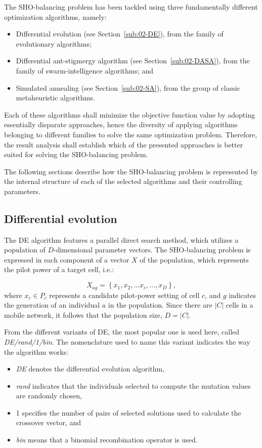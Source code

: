 The SHO-balancing problem has been tackled using three fundamentally
different optimization algorithms, namely:
\begin{itemize}
\item Differential evolution (see Section~\ref{sub:02-DE}), from the family
of evolutionary algorithms;
\item Differential ant-stigmergy algorithm (see Section~\ref{sub:02-DASA}),
from the family of swarm-intelligence algorithms; and
\item Simulated annealing (see Section~\ref{sub:02-SA}), from the group
of classic metaheuristic algorithms.
\end{itemize}
Each of these algorithms shall minimize the objective function value
by adopting essentially disparate approaches, hence the diversity
of applying algorithms belonging to different families to solve the
same optimization problem. Therefore, the result analysis shall establish
which of the presented approaches is better suited for solving the
SHO-balancing problem.

The following sections describe how the SHO-balancing problem is represented
by the internal structure of each of the selected algorithms and their
controlling parameters.


\subsection{Differential evolution}

The DE algorithm features a parallel direct search method, which utilizes
a population of $D$-dimensional parameter vectors. The SHO-balancing
problem is expressed in each component of a vector $X$ of the population,
which represents the pilot power of a target cell, i.e.:

\begin{equation}
X_{ag}=\left\{ x_{1},x_{2},\ldots x_{c},\ldots,x_{D}\right\} ,\label{eq:07-DE_mapping}
\end{equation}
where $x_{c}\in P_{c}$ represents a candidate pilot-power setting
of cell $c$, and $g$ indicates the generation of an individual $a$
in the population. Since there are $|C|$ cells in a mobile network,
it follows that the population size, $D=|C|$.

From the different variants of DE, the most popular one is used here,
called \emph{DE/rand/1/bin}. The nomenclature used to name this variant
indicates the way the algorithm works:
\begin{itemize}
\item \emph{DE }denotes the differential evolution algorithm,
\item \emph{rand }indicates that the individuals selected to compute the
mutation values are randomly chosen,
\item 1\emph{ }specifies the number of pairs of selected solutions used
to calculate the crossover vector, and
\item \emph{bin }means that a binomial recombination operator is used.
\end{itemize}

